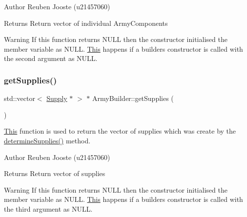 \begin{DoxyAuthor}{Author}
Reuben Jooste (u21457060) 
\end{DoxyAuthor}
\begin{DoxyReturn}{Returns}
Return vector of individual Army\+Components 
\end{DoxyReturn}
\begin{DoxyWarning}{Warning}
If this function returns N\+U\+LL then the constructor initialised the member variable as N\+U\+LL. \mbox{\hyperlink{class_this}{This}} happens if a builder\textquotesingle{}s constructor is called with the second argument as N\+U\+LL. 
\end{DoxyWarning}
\mbox{\label{class_army_builder_a48c19e9705bc720eec8f93f21ed15c55}} 
\subsubsection{\texorpdfstring{getSupplies()}{getSupplies()}}
{\footnotesize\ttfamily std\+::vector$<$ \mbox{\hyperlink{class_supply}{Supply}} $\ast$ $>$ $\ast$ Army\+Builder\+::get\+Supplies (\begin{DoxyParamCaption}{ }\end{DoxyParamCaption})}



\mbox{\hyperlink{class_this}{This}} function is used to return the vector of supplies which was create by the \mbox{\hyperlink{class_army_builder_ae999bf5bc4c83243f2d000e6f981c986}{determine\+Supplies()}} method. 

\begin{DoxyAuthor}{Author}
Reuben Jooste (u21457060) 
\end{DoxyAuthor}
\begin{DoxyReturn}{Returns}
Return vector of supplies 
\end{DoxyReturn}
\begin{DoxyWarning}{Warning}
If this function returns N\+U\+LL then the constructor initialised the member variable as N\+U\+LL. \mbox{\hyperlink{class_this}{This}} happens if a builder\textquotesingle{}s constructor is called with the third argument as N\+U\+LL. 
\end{DoxyWarning}
\mbox{\label{class_army_builder_a0a813968845cf859ba06a091d4c48385}} 

